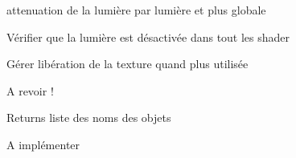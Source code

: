
\begin{DoxyRefList}
\item[\label{todo__todo000001}%
\hypertarget{todo__todo000001}{}%
Class \hyperlink{class_light}{Light} ]attenuation de la lumière par lumière et plus globale  
\item[\label{todo__todo000002}%
\hypertarget{todo__todo000002}{}%
Member \hyperlink{class_light_ad0e59fad13bb6cfadc25b2c477e9ddc7}{Light\+:\+:$\sim$\+Light} ()]Vérifier que la lumière est désactivée dans tout les shader  
\item[\label{todo__todo000003}%
\hypertarget{todo__todo000003}{}%
Member \hyperlink{class_material_a2c19452d71f54075df8f5405b03129f4}{Material\+:\+:$\sim$\+Material} ()]Gérer libération de la texture quand plus utilisée  
\item[\label{todo__todo000004}%
\hypertarget{todo__todo000004}{}%
Member \hyperlink{class_piece_a029823aa5135b356a9e4da14578db4e8}{Piece\+:\+:get\+Children} () const ]A revoir ! \begin{DoxyReturn}{Returns}
liste des noms des objets  
\end{DoxyReturn}

\item[\label{todo__todo000005}%
\hypertarget{todo__todo000005}{}%
Member \hyperlink{class_scene_ae87e88cbefc16640354acc8ec11b5e1e}{Scene\+:\+:save\+As\+X\+M\+L} (const Q\+String \&file\+Name)]A implémenter 
\end{DoxyRefList}